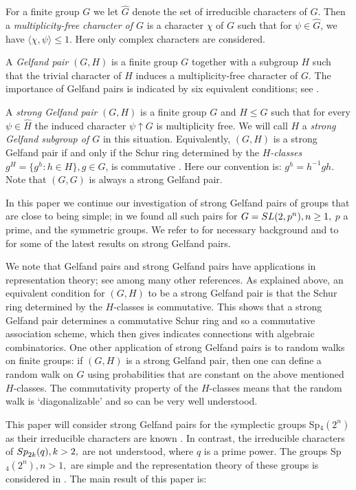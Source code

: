 \documentclass[10pt,a4paper]{amsart}
\theoremstyle{plain}
\theoremstyle{definition}
\numberwithin{equation}{section}
\begin{document}
For a finite group $G$ we let $\hat G$ denote the set of irreducible characters of $G$. Then  a {\it multiplicity-free character of $G$} is a character $\chi$ of $G$ such that for   $\psi\in \hat G$, we have $\langle \chi, \psi \rangle \leq 1$. Here only complex characters are considered.
 
A {\it Gelfand pair} $(G,H)$ is a finite group $G$ together with a subgroup $H$ such that the trivial character of $H$ induces a multiplicity-free character of
$G$. The importance of Gelfand pairs is indicated by six equivalent conditions; see     \cite{AHN, BH, Har, Wik}.


A {\it strong Gelfand pair} $(G,H)$ is a finite group $G$ and   $H\le G$ such that for every   $\psi \in \hat H$  the induced character $\psi\uparrow G$ is multiplicity free. 
We will call $H$ a {\it strong Gelfand subgroup of $G$} in this situation. 
Equivalently, $(G,H)$ is a strong Gelfand pair if and only if the Schur ring determined by the {\it $H$-classes} $g^H = \{ g^h : h \in H\}, g\in G$, is commutative \cite{Har, JKar, Den}. Here  our convention is: $g^h=h^{-1}gh$. Note that $(G,G)$ is always a strong Gelfand pair.

In this paper we continue our investigation of strong Gelfand pairs of  groups that are close to being simple; in \cite {AHN, BH, GH}  we found all such pairs for 
 $G={\rm SL}(2,p^n),n\ge 1,$  $p$ a prime, and  the  symmetric groups. We refer to \cite {BH,Har, GH} for necessary background and to \cite {BC} for some of  the latest results on strong Gelfand pairs.
 

 We note that Gelfand pairs and strong Gelfand pairs have applications in representation theory; see  \cite {A,AA,BC,C} among many other references.
As explained above, an equivalent condition for  $(G,H)$ to be  a strong Gelfand pair is that the Schur ring determined by the $H$-classes is commutative.
This shows that a strong Gelfand pair determines a commutative Schur ring and so a commutative  association scheme, which then gives  indicates connections with algebraic combinatorics.
One other application of strong Gelfand pairs is to random walks on finite groups: if $(G,H)$ is  a strong Gelfand pair, then one can define a random walk on $G$ using probabilities that are constant on the above mentioned $H$-classes. The commutativity property of the $H$-classes means that the random walk is `diagonalizable' and so can be very well 
understood.


This paper will consider strong Gelfand pairs for the symplectic groups {\rm Sp}$_4(2^n)$ as their irreducible characters are known \cite{speven}. In contrast, the irreducible characters of ${\rm Sp}_{2k}(q),k>2,$ are not understood, where $q$ is a prime power. The  groups {\rm Sp}$_4(2^n), n>1,$ are simple and  the representation theory of these groups is considered in \cite {Da}.
 The main result of this paper is: 
\end{document}
